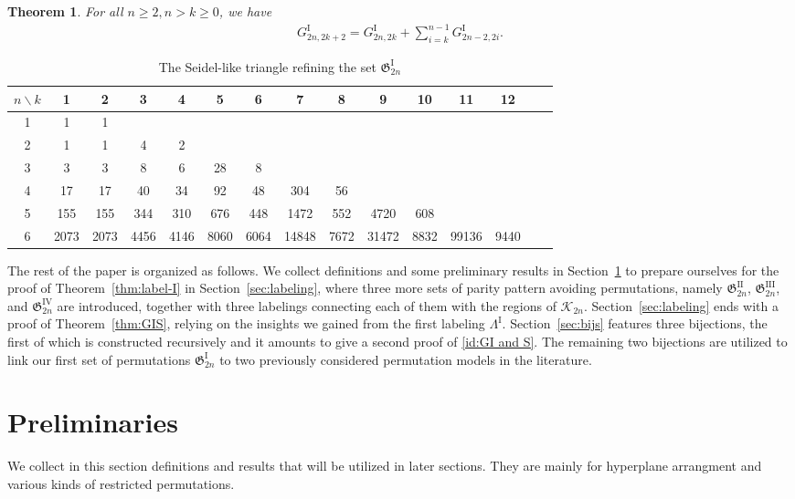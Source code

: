 \documentclass[11pt,reqno]{amsart}
\numberwithin{equation}{section}
\theoremstyle{plain}
\newtheorem{theorem}{Theorem}[section]
\theoremstyle{definition}
\newcommand{\fG}{\mathfrak{G}}
\newcommand{\cK}{\mathcal{K}}
\newcommand{\GI}{\fG^{\mathrm{I}}}
\newcommand{\GII}{\fG^{\mathrm{II}}}
\newcommand{\GIII}{\fG^{\mathrm{III}}}
\newcommand{\GIV}{\fG^{\mathrm{IV}}}
\newcommand{\Gi}{G^{\mathrm{I}}}
\newcommand{\LI}{\Lambda^{\mathrm{I}}}
\begin{document}
\begin{theorem} \label{En-even}
	For all $n\ge 2,n>k\ge 0$, we have 
\begin{align}
\Gi_{2n,2k+2}=\Gi_{2n,2k}+\sum\limits_{i=k}^{n-1} \Gi_{2n-2,2i}.\label{id:GI even rec}
\end{align}
\end{theorem}



\begin{table}[ht]
    \renewcommand{\arraystretch}{1.1}
    \centering
    \begin{tabular}{c|cccccccccccccc}
        $n \backslash k$ & 1 & 2 & 3 & 4 & 5 & 6 & 7 & 8 & 9 & 10 & 11 & 12 \\ \hline
        1 & 1 &1  \\ 
        2 & 1 &1 & 4 & 2  \\ 
        3 & 3 &3 & 8 & 6 & 28 & 8  \\ 
        4 & 17 &17 & 40 & 34 & 92 & 48 & 304 & 56  \\ 
        5 & 155 &155 & 344 & 310 & 676 & 448 & 1472 & 552 & 4720 & 608  \\ 
        6 & 2073 & 2073 & 4456 & 4146 & 8060 & 6064 & 14848 & 7672 & 31472 & 8832 & 99136 & 9440 \\
    \end{tabular}
    \smallskip
    \caption{The Seidel-like triangle refining the set $\GI_{2n}$} \label{Tab:GI}
\end{table}

The rest of the paper is organized as follows. We collect definitions and some preliminary results in Section~\ref{sec:pre} to prepare ourselves for the proof of Theorem~\ref{thm:label-I} in Section~\ref{sec:labeling}, where three more sets of parity pattern avoiding permutations, namely $\GII_{2n}$, $\GIII_{2n}$, and $\GIV_{2n}$ are introduced, together with three labelings connecting each of them with the regions of $\cK_{2n}$. Section~\ref{sec:labeling} ends with a proof of Theorem~\ref{thm:GIS}, relying on the insights we gained from the first labeling $\LI$. Section~\ref{sec:bijs} features three bijections, the first of which is constructed recursively and it amounts to give a second proof of \eqref{id:GI and S}. The remaining two bijections are utilized to link our first set of permutations $\GI_{2n}$ to two previously considered permutation models in the literature. 






\section{Preliminaries}\label{sec:pre}
We collect in this section definitions and results that will be utilized in later sections. They are mainly for hyperplane arrangment and various kinds of restricted permutations.
\end{document}
